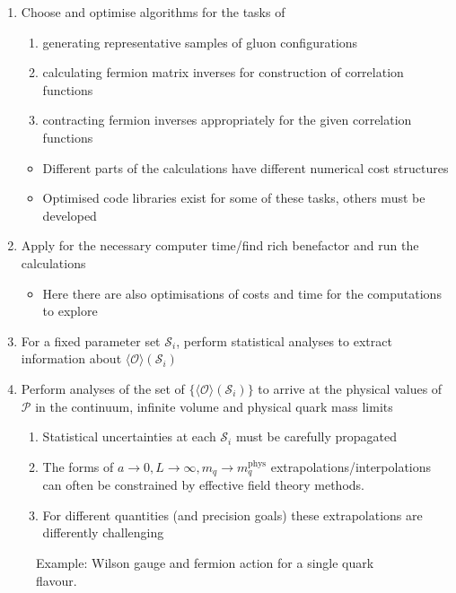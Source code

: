 \begin{enumerate}
\begin{itemize}
        \item Ideally this tuning would be done taking the infinite volume limit at each set of action parameters
        \item This procedure is almost always undertaken iteratively, defining new parameter sets to use as more is learnt about the system.
    \end{itemize}
    \item Choose and optimise algorithms for the tasks of
    \begin{enumerate}
        \item generating representative samples of gluon configurations
        \item calculating fermion matrix inverses for construction of correlation functions
        \item contracting fermion inverses appropriately for the given correlation functions
    \end{enumerate}
    \begin{itemize}
        \item Different parts of the calculations have different numerical cost structures
        \item Optimised code libraries exist for some of these tasks, others must be developed
    \end{itemize}
    \item Apply for the necessary computer time/find rich benefactor and run the calculations
    \begin{itemize}
        \item Here there are also optimisations of costs and time for the computations to explore
    \end{itemize}
    \item For a fixed parameter set $\mathcal{S}_i$, perform statistical analyses to extract information about $\langle \mathcal{O} \rangle(\mathcal{S}_i)$
    \item Perform analyses of the set of $\{\langle \mathcal{O} \rangle ( \mathcal{S}_i)\}$ to arrive at the physical values of $\mathcal{P}$ in the continuum, infinite volume and physical quark mass limits
    \begin{enumerate}
        \item Statistical uncertainties at each $\mathcal{S}_i$ must be carefully propagated
        \item The forms of $a \rightarrow 0, L \rightarrow \infty, m_q \rightarrow m_q^\text{phys}$ extrapolations/interpolations can often be constrained by effective field theory methods.
        \item For different quantities (and precision goals) these extrapolations are differently challenging
    \end{enumerate}
\end{enumerate}
\begin{figure}
\caption{Example: Wilson gauge and fermion action for a single quark flavour.\label{fig:ac_param_trajectories}
}
\end{figure}

